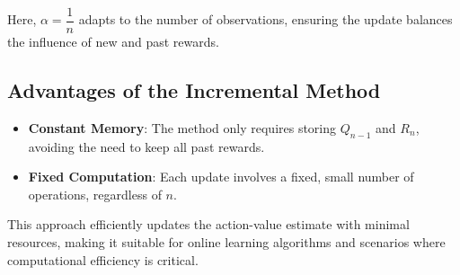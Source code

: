 \documentclass[
  letterpaper,
]{krantz}
\providecommand{\tightlist}{%
  \setlength{\itemsep}{0pt}\setlength{\parskip}{0pt}}\usepackage{longtable,booktabs,array}
\theoremstyle{plain}
\theoremstyle{definition}
\theoremstyle{definition}
\theoremstyle{remark}
\begin{document}
Here, \(\alpha = \dfrac{1}{n}\) adapts to the number of observations,
ensuring the update balances the influence of new and past rewards.

\subsection{Advantages of the Incremental
Method}\label{advantages-of-the-incremental-method}

\begin{itemize}
\tightlist
\item
  \textbf{Constant Memory}: The method only requires storing \(Q_{n-1}\)
  and \(R_n\), avoiding the need to keep all past rewards.
\item
  \textbf{Fixed Computation}: Each update involves a fixed, small number
  of operations, regardless of \(n\).
\end{itemize}

This approach efficiently updates the action-value estimate with minimal
resources, making it suitable for online learning algorithms and
scenarios where computational efficiency is critical.
\end{document}
